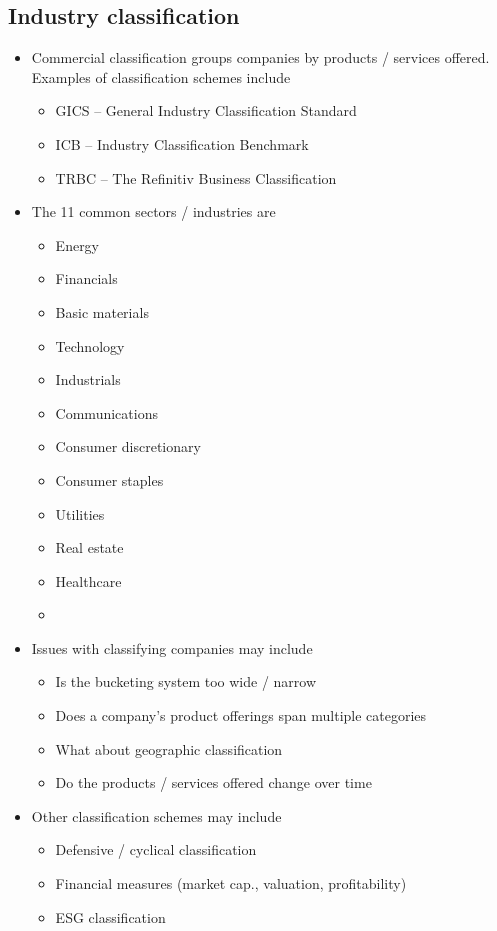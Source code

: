 \documentclass[../notes_compiled.tex]{subfiles}
\begin{document}
\subsection{Industry classification}
\begin{itemize}
\item Commercial classification groups companies by products / services offered. Examples of classification schemes include
\begin{itemize}
\item GICS -- General Industry Classification Standard
\item ICB -- Industry Classification Benchmark
\item TRBC -- The Refinitiv Business Classification
\end{itemize}
\item The 11 common sectors / industries are
\begin{multicols}{3}
\begin{itemize}
\item Energy
\item Financials
\item Basic materials
\item Technology
\item Industrials
\item Communications
\item Consumer discretionary
\item Consumer staples
\item Utilities
\item Real estate
\item Healthcare
\item[]
\end{itemize}
\end{multicols}
\item Issues with classifying companies may include
\begin{itemize}
\item Is the bucketing system too wide / narrow
\item Does a company’s product offerings span multiple categories
\item What about geographic classification
\item Do the products / services offered change over time
\end{itemize}
\item Other classification schemes may include
\begin{itemize}
\item Defensive / cyclical classification
\item Financial measures (market cap., valuation, profitability)
\item ESG classification
\end{itemize}
\end{itemize}
\end{document}
